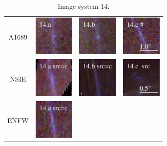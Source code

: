 \documentclass[useAMS,usenatbib]{mn2e}
\begin{document}
\begin{table}
  \caption{Image system 14:}\vspace{0mm}
  \begin{tabular}{cccc}
    \multicolumn{1}{m{1cm}}{{\Large A1689}}
    & \multicolumn{1}{m{1.7cm}}{\includegraphics[height=2.00cm,clip]{figs/nsie_img/rgb.img_14_a.ps}}
    & \multicolumn{1}{m{1.7cm}}{\includegraphics[height=2.00cm,clip]{figs/nsie_img/rgb.img_14_b.ps}}
    & \multicolumn{1}{m{1.7cm}}{\includegraphics[height=2.00cm,clip]{figs/nsie_img/rgb.img_14_c.ps}} \\
    \multicolumn{1}{m{1cm}}{{\Large NSIE}}
    & \multicolumn{1}{m{1.7cm}}{\includegraphics[height=2.00cm,clip]{figs/nsie_img/rgb.pre_14_a_c_tri.ps}}
    & \multicolumn{1}{m{1.7cm}}{\includegraphics[height=2.00cm,clip]{figs/nsie_img/rgb.pre_14_b_c_tri.ps}}
    & \multicolumn{1}{m{1.7cm}}{\includegraphics[height=2.00cm,clip]{figs/nsie_img/rgb.src_14_c.ps}} \\
    \multicolumn{1}{m{1cm}}{{\Large ENFW}}
    & \multicolumn{1}{m{1.7cm}}{\includegraphics[height=2.00cm,clip]{figs/enfw_img/rgb.pre_14_a_c_tri.ps}}

\end{tabular}
\end{table}
\end{document}
